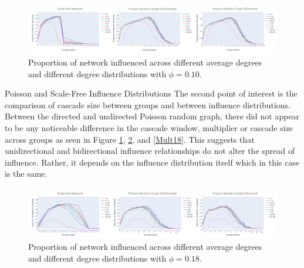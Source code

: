 \documentclass[10pt, oneside, reqno]{amsart}
\makeatletter
\theoremstyle{plain}%
\theoremstyle{definition}
\theoremstyle{remark}
\renewcommand\subsection{\@startsection{subsection}{2}%
  \z@{.5\linespacing\@plus.7\linespacing}{-.5em}%
  {\normalfont\scshape}}
\makeatother
\begin{document}
\begin{figure}[ht]
    \includegraphics[scale=0.2]{Report/figs/SFRGRG10.png}
    \caption{Proportion of network influenced across different average degrees and different degree distributions with $\phi = 0.10$.}
    \label{Phi10}
\end{figure}

\subsection{Poisson and Scale-Free Influence Distributions}
The second point of interest is the comparison of cascade size between groups and between influence distributions. 
Between the directed and undirected Poisson random graph, there did not appear to be any noticeable difference in the cascade window, multiplier or cascade size across groups as seen in Figure \ref{Phi10}, \ref{Phi18}, and \ref{Mult18}.
This suggests that unidirectional and bidirectional influence relationships do not alter the spread of influence. 
Rather, it depends on the influence distribution itself which in this case is the same.



\begin{figure}[ht]
    \includegraphics[scale=0.2]{Report/figs/SFRGRG18.png}
    \caption{Proportion of network influenced across different average degrees and different degree distributions with $\phi = 0.18$.}
    \label{Phi18}
\end{figure}

\end{document}
